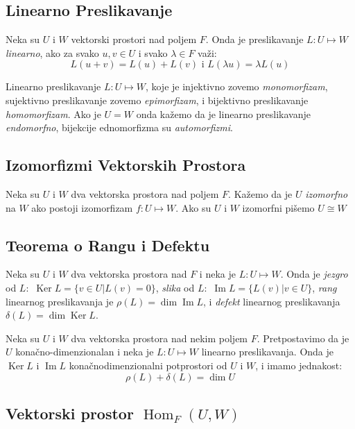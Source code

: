\documentclass[12p,a4paper]{article}
\DeclareMathOperator{\Ker}{Ker}
\DeclareMathOperator{\Ima}{Im}
\DeclareMathOperator{\Hom}{Hom}
\begin{document}
\begin{multicols}{2}
\section{Linearno Preslikavanje}

    Neka su $U$ i $W$ vektorski prostori nad poljem $F$. Onda je preslikavanje 
    $L: U \mapsto W$ \textit{linearno}, ako za svako $u, v \in U$ i svako 
    $\lambda \in F$ važi:
    \[ L(u + v) = L(u) + L(v) \text{  i  } L(\lambda u) = \lambda L(u)\]

    Linearno preslikavanje $L : U \mapsto W$, 
    koje je injektivno zovemo \textit{monomorfizam}, 
    sujektivno preslikavanje zovemo \textit{epimorfizam}, 
    i bijektivno preslikavanje \textit{homomorfizam}. 
    Ako je $U = W$ onda kažemo da je linearno preslikavanje 
    \textit{endomorfno}, bijekcije ednomorfizma su \textit{automorfizmi}.

\subsection{Izomorfizmi Vektorskih Prostora}

    Neka su $U$ i $W$ dva vektorska prostora nad poljem $F$. Kažemo da je $U$ 
    \textit{izomorfno} na $W$ ako postoji izomorfizam $f : U \mapsto W$. 
    Ako su $U$ i $W$ izomorfni pišemo $U \cong W$

\subsection{Teorema o Rangu i Defektu}

    Neka su $U$ i $W$ dva vektorska prostora nad $F$ i neka je 
    $L : U \mapsto W$. Onda je \textit{jezgro} od $L$:\ 
    $\Ker L= \{v \in U | L(v) = 0 \}$, \textit{slika} od $L$:\ 
    $\Ima L = \{ L(v) | v \in U\}$, \textit{rang} linearnog preslikavanja je 
    $\rho (L) = \dim \Ima L$, i \textit{defekt} linearnog preslikavanja 
    $\delta(L) = \dim \Ker L$.

    Neka su $U$ i $W$ dva vektorska prostora nad nekim poljem $F$. 
    Pretpostavimo da je $U$ konačno-dimenzionalan i neka je 
    $L : U \mapsto W$ linearno preslikavanja. Onda je $\Ker L$ i $\Ima L$ 
    konačnodimenzionalni potprostori od $U$ i $W$, i imamo jednakost:
    \[\rho (L) + \delta (L) = \dim U \]

\subsection{Vektorski prostor $\Hom_F (U, W)$}


\end{multicols}
\end{document}
